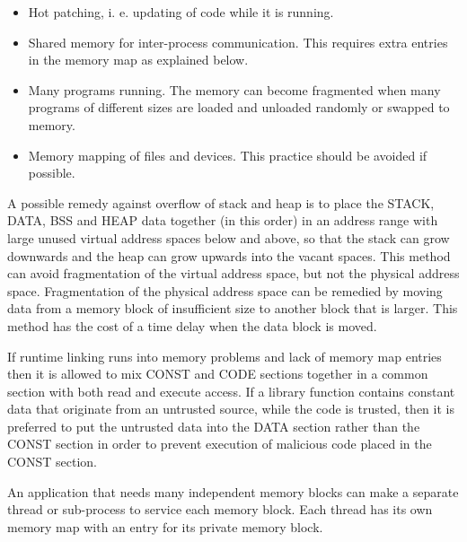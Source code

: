 \documentclass[forwardcom.tex]{subfiles}
\begin{document}
\begin{itemize}
\item Hot patching, i. e. updating of code while it is running. 

\item Shared memory for inter-process communication. This requires extra entries in the memory map as explained below.

\item Many programs running. The memory can become fragmented when many programs of different sizes are loaded and unloaded randomly or swapped to memory. 

\item Memory mapping of files and devices. This practice should be avoided if possible.

\end{itemize}

A possible remedy against overflow of stack and heap is to place the STACK, DATA, BSS and HEAP data together (in this order) in an address range with large unused virtual address spaces below and above, so that the stack can grow downwards and the heap can grow upwards into the vacant spaces. This method can avoid fragmentation of the virtual address space, but not the physical address space. Fragmentation of the physical address space can be remedied by moving data from a memory block of insufficient size to another block that is larger. This method has the cost of a time delay when the data block is moved. 
\vv

If runtime linking runs into memory problems and lack of memory map entries then it is allowed to mix CONST and CODE sections together in a common section with both read and execute access. If a library function contains constant data that originate from an untrusted source, while the code is trusted, then it is preferred to put the untrusted data into the DATA section rather than the CONST section in order to prevent execution of malicious code placed in the CONST section.
\vv

An application that needs many independent memory blocks can make a separate thread or sub-process to service each memory block. Each thread has its own memory map with an entry for its private memory block.
\vv
\end{document}
